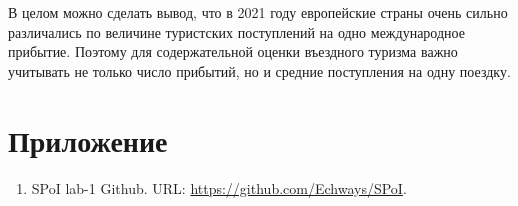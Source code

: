 \documentclass[14pt,a4paper]{extarticle}
\begin{document}
В целом можно сделать вывод, что в 2021 году европейские страны очень сильно различались по величине туристских поступлений на одно международное прибытие. Поэтому для содержательной оценки въездного туризма важно учитывать не только число прибытий, но и средние поступления на одну поездку.

\section*{Приложение}

\begin{enumerate}[leftmargin=1.25cm]
    \item SPoI lab-1 Github. URL: \url{https://github.com/Echways/SPoI}.
\end{enumerate}
\end{document}
